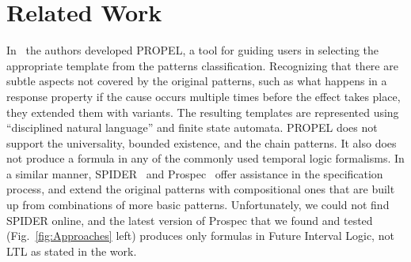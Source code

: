 \documentclass[letter]{llncs}
\begin{document}
\section{Related Work}
\label{sec:RelatedWork}
In~\cite{Smith02propel:an} the authors developed PROPEL, a tool for guiding users in 
selecting the appropriate template from the patterns classification. Recognizing that there are subtle aspects
not covered by the original patterns, such as what happens in a response
property if the cause occurs multiple times before the effect takes place,
they extended them with variants. The resulting templates 
are represented using ``disciplined natural language'' and finite state automata. 
PROPEL does not support the universality, bounded existence, and the chain patterns. It also 
does not produce a formula in any of the commonly used temporal logic formalisms.
In a similar manner, SPIDER~\cite{konrad2005facilitating} and 
Prospec~\cite{Mondragon_prospec} offer assistance in the specification process, and extend the original patterns
with compositional ones that are built up from combinations of more basic patterns. 
Unfortunately, we could not find SPIDER online, and the latest version of Prospec that we found and tested (Fig.~\ref{fig:Approaches} left) produces only 
formulas in Future Interval Logic, not LTL as stated in the work.
\end{document}
